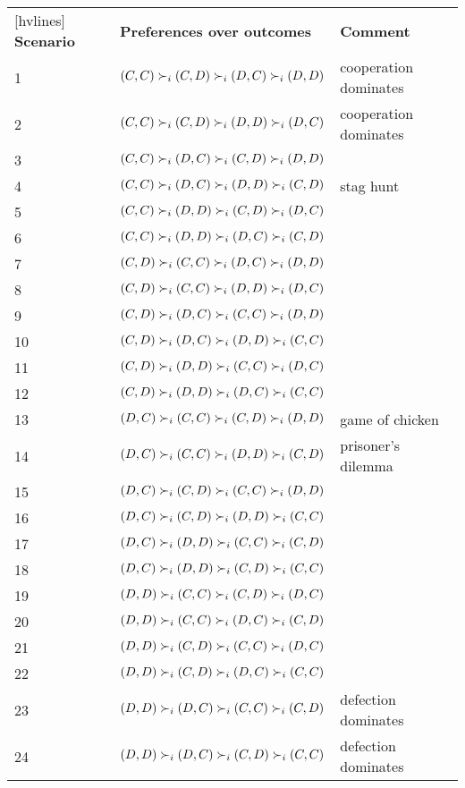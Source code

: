 	\begin{table}[!h]
	\centering
	\begin{NiceTabular}{lll}[hvlines]
	\textbf{Scenario}&\textbf{Preferences over outcomes}&\textbf{Comment}\\
	1&$(C,C)\succ_i(C,D)\succ_i(D,C)\succ_i(D,D)$&cooperation dominates\\
	2&$(C,C)\succ_i(C,D)\succ_i(D,D)\succ_i(D,C)$&cooperation dominates\\
	3&$(C,C)\succ_i(D,C)\succ_i(C,D)\succ_i(D,D)$&\\
	4&$(C,C)\succ_i(D,C)\succ_i(D,D)\succ_i(C,D)$&stag hunt\\
	5&$(C,C)\succ_i(D,D)\succ_i(C,D)\succ_i(D,C)$&\\
	6&$(C,C)\succ_i(D,D)\succ_i(D,C)\succ_i(C,D)$&\\
	7&$(C,D)\succ_i(C,C)\succ_i(D,C)\succ_i(D,D)$&\\
	8&$(C,D)\succ_i(C,C)\succ_i(D,D)\succ_i(D,C)$&\\
	9&$(C,D)\succ_i(D,C)\succ_i(C,C)\succ_i(D,D)$&\\
	10&$(C,D)\succ_i(D,C)\succ_i(D,D)\succ_i(C,C)$&\\
	11&$(C,D)\succ_i(D,D)\succ_i(C,C)\succ_i(D,C)$&\\
	12&$(C,D)\succ_i(D,D)\succ_i(D,C)\succ_i(C,C)$&\\
	13&$(D,C)\succ_i(C,C)\succ_i(C,D)\succ_i(D,D)$&game of chicken\\
	14&$(D,C)\succ_i(C,C)\succ_i(D,D)\succ_i(C,D)$&prisoner’s dilemma\\
	15&$(D,C)\succ_i(C,D)\succ_i(C,C)\succ_i(D,D)$&\\
	16&$(D,C)\succ_i(C,D)\succ_i(D,D)\succ_i(C,C)$&\\
	17&$(D,C)\succ_i(D,D)\succ_i(C,C)\succ_i(C,D)$&\\
	18&$(D,C)\succ_i(D,D)\succ_i(C,D)\succ_i(C,C)$&\\
	19&$(D,D)\succ_i(C,C)\succ_i(C,D)\succ_i(D,C)$&\\
	20&$(D,D)\succ_i(C,C)\succ_i(D,C)\succ_i(C,D)$&\\
	21&$(D,D)\succ_i(C,D)\succ_i(C,C)\succ_i(D,C)$&\\
	22&$(D,D)\succ_i(C,D)\succ_i(D,C)\succ_i(C,C)$&\\
	23&$(D,D)\succ_i(D,C)\succ_i(C,C)\succ_i(C,D)$&defection dominates\\
	24&$(D,D)\succ_i(D,C)\succ_i(C,D)\succ_i(C,C)$&defection dominates
	\end{NiceTabular}
	\end{table}

